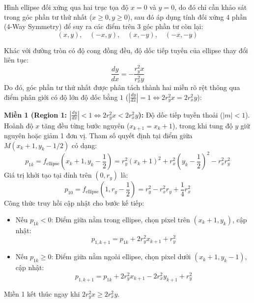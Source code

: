 Hình ellipse đối xứng qua hai trục tọa độ $x = 0$ và $y = 0$, do đó chỉ cần khảo sát trong góc phần tư thứ nhất ($x \ge 0, y \ge 0$), sau đó áp dụng tính đối xứng 4 phần (4-Way Symmetry) để suy ra các điểm trên 3 góc phần tư còn lại:
\begin{equation}
(x, y), \quad (-x, y), \quad (x, -y), \quad (-x, -y)
\end{equation}

Khác với đường tròn có độ cong đồng đều, độ dốc tiếp tuyến của ellipse thay đổi liên tục:
\begin{equation}
\frac{dy}{dx} = -\frac{r_y^2 x}{r_x^2 y}
\end{equation}
Do đó, góc phần tư thứ nhất được phân tách thành hai miền rõ rệt thông qua điểm phân giới có độ lớn độ dốc bằng $1$ ($|\frac{dy}{dx}| = 1 \iff 2 r_y^2 x = 2 r_x^2 y$):

\textbf{Miền 1 (Region 1: $|\frac{dy}{dx}| < 1 \iff 2 r_y^2 x < 2 r_x^2 y$):}
Độ dốc tiếp tuyến thoải ($|m| < 1$). Hoành độ $x$ tăng đều từng bước nguyên ($x_{k+1} = x_k + 1$), trong khi tung độ $y$ giữ nguyên hoặc giảm 1 đơn vị. Tham số quyết định tại điểm giữa $M(x_k + 1, y_k - 1/2)$ có dạng:
\begin{equation}
p_{1k} = f_{\text{ellipse}}\left( x_k + 1, y_k - \frac{1}{2} \right) = r_y^2 (x_k + 1)^2 + r_x^2 \left( y_k - \frac{1}{2} \right)^2 - r_x^2 r_y^2
\end{equation}
Giá trị khởi tạo tại đỉnh trên $(0, r_y)$ là:
\begin{equation}
p_{10} = f_{\text{ellipse}}\left( 1, r_y - \frac{1}{2} \right) = r_y^2 - r_x^2 r_y + \frac{1}{4} r_x^2
\end{equation}
Công thức truy hồi cập nhật cho bước kế tiếp:
\begin{itemize}
    \item Nếu $p_{1k} < 0$: Điểm giữa nằm trong ellipse, chọn pixel trên $(x_k + 1, y_k)$, cập nhật:
    \begin{equation}
    p_{1, k+1} = p_{1k} + 2 r_y^2 x_{k+1} + r_y^2
    \end{equation}
    \item Nếu $p_{1k} \ge 0$: Điểm giữa nằm ngoài ellipse, chọn pixel dưới $(x_k + 1, y_k - 1)$, cập nhật:
    \begin{equation}
    p_{1, k+1} = p_{1k} + 2 r_y^2 x_{k+1} - 2 r_x^2 y_{k+1} + r_y^2
    \end{equation}
\end{itemize}
Miền 1 kết thúc ngay khi $2 r_y^2 x \ge 2 r_x^2 y$.

